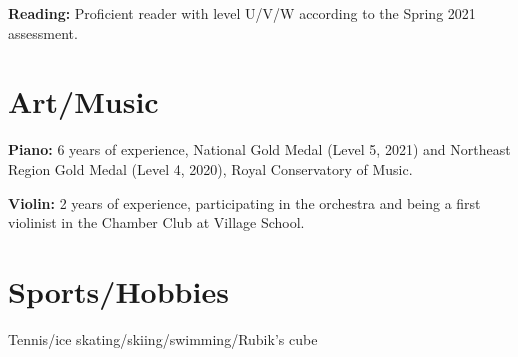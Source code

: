 \documentclass[line,margin]{res}
\begin{document}
\begin{resume}
  {\bf  Reading:} Proficient reader with level U/V/W according to the
  Spring 2021 assessment.

  \section{Art/Music}
  {\bf  Piano:} 6 years of experience, National Gold Medal (Level 5,
  2021) and Northeast Region Gold Medal (Level 4, 2020), Royal
  Conservatory of Music.

  {\bf  Violin:} 2 years of experience, participating in the
  orchestra and being a first violinist in the Chamber Club at Village School.

  \section{Sports/Hobbies}

  {Tennis/ice skating/skiing/swimming/Rubik's cube}


\end{resume}
\end{document}
